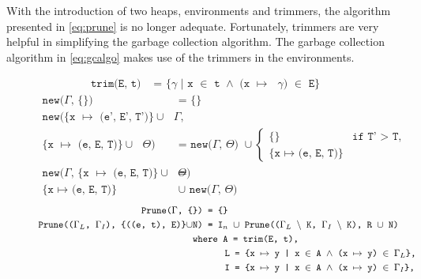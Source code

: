 With the introduction of two heaps, environments and trimmers, the algorithm presented in \autoref{eq:prune} is no longer adequate.
Fortunately, trimmers are very helpful in simplifying the garbage collection algorithm.
The garbage collection algorithm in \autoref{eq:gcalgo} makes use of the trimmers in the environments.
\begin{figure}
  \begin{mdframed}[style=bigbox]
\begin{align}
  \texttt{trim(E, t) }&\texttt{= \{$\gamma$ | x $\in$ t $\land$ (x $\mapsto$ $\gamma$) $\in$ E\}} \tag*{}
\end{align}
\begin{align}
  \texttt{new($\Gamma$, \{\}) }&\texttt{= \{\} }\tag*{}\\
  \texttt{new(\{x $\mapsto$ (e', E', T')\} $\cup$ $\Gamma$,}\tag*{}\\
  \texttt{\{x $\mapsto$ (e, E, T)\} $\cup$ $\Theta$) }&\texttt{= new($\Gamma$, $\Theta$) $\cup$}
  \begin{cases}
    \texttt{\{\}} & \texttt{if T' $>$ T,}\\
    \texttt{\{x $\mapsto$ (e, E, T)\}} & 
  \end{cases}
  \tag*{}\\
  \texttt{new($\Gamma$, \{x $\mapsto$ (e, E, T)\} $\cup$ $\Theta$) }&\texttt{=}\tag*{}\\
  \texttt{\{x $\mapsto$ (e, E, T)\} }&\texttt{$\cup$ new($\Gamma$, $\Theta$)}\tag*{}
\end{align}
\begin{align}
  \texttt{Prune($\Gamma$, \{\}) }&\texttt{= \{\}} \tag*{}\\
  \texttt{Prune(($\Gamma_L$, $\Gamma_I$), \{((e, t), E)\}$\cup$N) }&\texttt{=  I$_n$ $\cup$ Prune(($\Gamma_L$ $\backslash$ K, $\Gamma_I$ $\backslash$ K), R $\cup$ N)} \tag*{}\\
  \wherecase{A = trim(E, t),} \tag*{}\\
  \extracase{L = \{x $\mapsto$ y | x $\in$ A $\land$ (x $\mapsto$ y) $\in$ $\Gamma_L$\},} \tag*{}\\
  \extracase{I = \{x $\mapsto$ y | x $\in$ A $\land$ (x $\mapsto$ y) $\in$ $\Gamma_I$\},} \tag*{}\\

\end{align}
\end{mdframed}
\end{figure}
